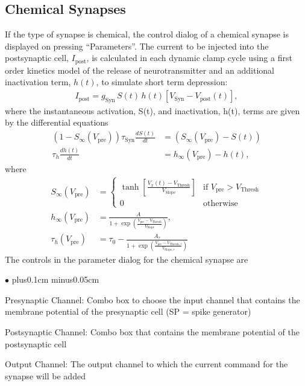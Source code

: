 \documentclass{article}
\newenvironment{myitem}{\begin{list}{$\bullet$}{\setlength{\leftmargin}{1.1em}
\itemsep0.1cm plus0.1cm minus0.05cm
\listparindent0cm
\addtolength{\labelsep}{0.5\labelsep}
\setlength{\labelwidth}{0.8em}
\setlength{\leftmargin}{\labelwidth}
\addtolength{\leftmargin}{\labelsep}
}}{\end{list}}
\begin{document}
\subsection{Chemical Synapses}
If the type of synapse is chemical, the control dialog of a chemical
synapse is displayed on pressing ``Parameters''. The current to be
injected into the postsynaptic cell, $I_{\text{post}}$, is calculated
in each dynamic clamp cycle using a first order kinetics model of the
release of neurotransmitter \cite{Destexhe1994} and an additional
inactivation term, $h(t)$, to simulate short term depression:
\begin{align}
  I_{\text{post}} = g_{\text{Syn}} \, S(t) \, h(t) [V_{\text{Syn}} -
    V_{\text{post}}(t)],
\end{align}
where the instantaneous activation, S(t), and inactivation, h(t), terms are
given by the differential equations
\begin{align}
(1-S_\infty(V_{\text{pre}})) \tau_{\text{Syn}} \frac{dS(t)}{dt} &=
(S_\infty(V_{\text{pre}}) - S(t)) \\ \tau_h \frac{dh(t)}{dt} &=
h_\infty(V_{\text{pre}}) - h(t),
\end{align}
where
\begin{align}
S_\infty(V_{\text{pre}}) &= \left\{
\begin{array}{ll}
  \tanh\left[\frac{V_x(t) - V_{\text{Thresh}}}{V_{\text{Slope}}}
    \right] & \text{if } V_{\text{pre}} > V_{\text{Thresh}} \\ 0 &
  \text{otherwise}
  \end{array}
\right. \\ 
%
h_\infty(V_{\text{pre}})&=
\frac{A}{1+\exp\left(\frac{V_{\text{pre}} -
    V_{\text{Thresh}}}{V_{\text{Slope}}}\right)}, \\  
\tau_h(V_{\text{pre}})&= \tau_{0} -
\frac{A_\tau}{1+\exp\left(\frac{V_{\text{pre}} -
    V_{\text{Thresh},\tau}}{V_{\text{Slope},\tau}} \right)}
\end{align}                                              
  The controls in the parameter dialog for the chemical synapse are
  \begin{myitem}
  \item Presynaptic Channel: Combo box to choose the input channel
    that contains the membrane potential of the presynaptic cell (SP = spike
    generator) 
  \item Postsynaptic Channel: Combo box that contains the membrane
    potential of the postsynaptic cell
\item Output Channel: The output channel to which the current command
  for the synapse will be added
\end{myitem}
\end{document}
